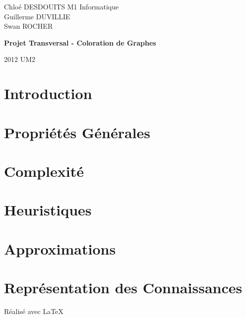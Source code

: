 \documentclass[a4paper]{report}
\begin{document}
\large
\setlength{\parskip}{5mm plus3mm minus3mm}
 
{\setlength{\parindent}{0cm}
Chlo\'e DESDOUITS \hfill M1 Informatique \\
Guillerme DUVILLIE \\
Swan ROCHER
}
\vfill
{\centering \Huge \bfseries Projet Transversal - Coloration de Graphes\par}
\vfill
2012 \hfill UM2

\tableofcontents
\thispagestyle{empty}


\chapter{Introduction}\label{chap1}


\chapter{Propri\'et\'es G\'en\'erales}\label{chap2}


\chapter{Complexité}


\chapter{Heuristiques}\label{chap4}


\chapter{Approximations}\label{chap5}






\chapter{Repr\'esentation des Connaissances}\label{chap9}



\vfill
{\raggedleft R\'ealis\'e avec \LaTeX{} \par}
\end{document}
